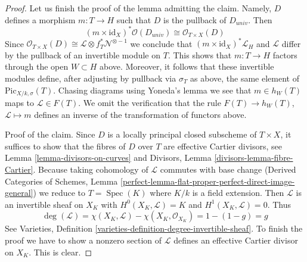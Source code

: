 \documentclass[10pt,a4paper]{amsart}
\theoremstyle{plain}
\theoremstyle{definition}
\theoremstyle{remark}
\numberwithin{equation}{subsection}
\def\Spec{\mathop{\mathrm{Spec}}}
\def\Picardfunctor{\mathrm{Pic}}
\begin{document}
\begin{proof}
\medskip\noindent
Let us finish the proof of the lemma admitting the claim.
Namely, $D$ defines a morphism $m : T \to H$ such that $D$ is the pullback of
$D_{univ}$. Then
$$
(m \times \text{id}_X)^*\mathcal{O}(D_{univ}) \cong
\mathcal{O}_{T \times X}(D)
$$
Since $\mathcal{O}_{T \times X}(D) \cong
\mathcal{L} \otimes f_T^*\mathcal{N}^{\otimes -1}$
we conclude that $(m \times \text{id}_X)^*\mathcal{L}_H$ and $\mathcal{L}$
differ by the pullback of an invertible module on $T$.
This shows that $m : T \to H$ factors through the open $W \subset H$ above.
Moreover, it follows that these invertible modules define, after adjusting
by pullback via $\sigma_T$ as above, the same element of
$\Picardfunctor_{X/k, \sigma}(T)$. Chasing diagrams using Yoneda's lemma
we see that $m \in h_W(T)$ maps to $\mathcal{L} \in F(T)$. We omit
the verification that the rule $F(T) \to h_W(T)$,
$\mathcal{L} \mapsto m$ defines an inverse of the transformation
of functors above.

\medskip\noindent
Proof of the claim. Since $D$ is a locally principal closed subscheme
of $T \times X$, it suffices to show that the fibres of $D$ over $T$ are
effective Cartier divisors, see Lemma \ref{lemma-divisors-on-curves} and
Divisors, Lemma \ref{divisors-lemma-fibre-Cartier}. Because taking
cohomology of $\mathcal{L}$ commutes with base change
(Derived Categories of Schemes, Lemma
\ref{perfect-lemma-flat-proper-perfect-direct-image-general})
we reduce to $T = \Spec(K)$ where $K/k$ is a field extension.
Then $\mathcal{L}$ is an invertible sheaf on $X_K$ with
$H^0(X_K, \mathcal{L}) = K$ and $H^1(X_K, \mathcal{L}) = 0$. Thus
$$
\deg(\mathcal{L}) = \chi(X_K, \mathcal{L}) - \chi(X_K, \mathcal{O}_{X_K})
= 1 - (1 - g) = g
$$
See Varieties, Definition \ref{varieties-definition-degree-invertible-sheaf}.
To finish the proof we have to show a nonzero section of $\mathcal{L}$
defines an effective Cartier divisor on $X_K$.
This is clear.
\end{proof}
\end{document}
